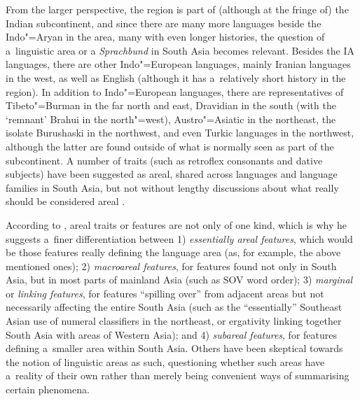 From the larger perspective, the region is part of (although at the fringe of) the Indian subcontinent, and since there are many more languages beside the Indo"=Aryan in the area, many with even longer histories, the question of a~linguistic area or a \textit{Sprachbund} in South Asia becomes relevant. Besides the IA languages, there are other Indo"=European languages, mainly Iranian languages in the west, as well as English (although it has a~relatively short history in the region). In addition to Indo"=European languages, there are representatives of Tibeto"=Burman in the far north and east, Dravidian in the south (with the `remnant' Brahui in the north"=west), Austro"=Asiatic in the northeast, the isolate Burushaski in the northwest, and even Turkic languages in the northwest, although the latter are found outside of what is normally seen as part of the subcontinent. A number of traits (such as retroflex consonants and dative subjects) have been suggested as areal, shared across languages and language families in South Asia, but not without lengthy discussions about what really should be considered areal \citep{emeneau1965,emeneau1980,masica1976,masica1991,masica2001,ebert2006}.


According to \citet{masica2001}, areal traits or features are not only of one kind, which is why he suggests a~finer differentiation between 1) \textit{essentially areal features}, which would be those features really defining the language area (as, for example, the above mentioned ones); 2) \textit{macroareal features}, for features found not only in South Asia, but in most parts of mainland Asia (such as SOV word order); 3) \textit{marginal} or \textit{linking features}, for features ``spilling over'' from adjacent areas but not necessarily affecting the entire South Asia (such as the ``essentially'' Southeast Asian use of numeral classifiers in the northeast, or ergativity linking together South Asia with areas of Western Asia); and 4) \textit{subareal features}, for features defining a~smaller area within South Asia. Others \citep{dahl2001,ktammwaelchli2001} have been skeptical towards the notion of linguistic areas as such, questioning whether such areas have a~reality of their own rather than merely being convenient ways of summarising certain phenomena. 


